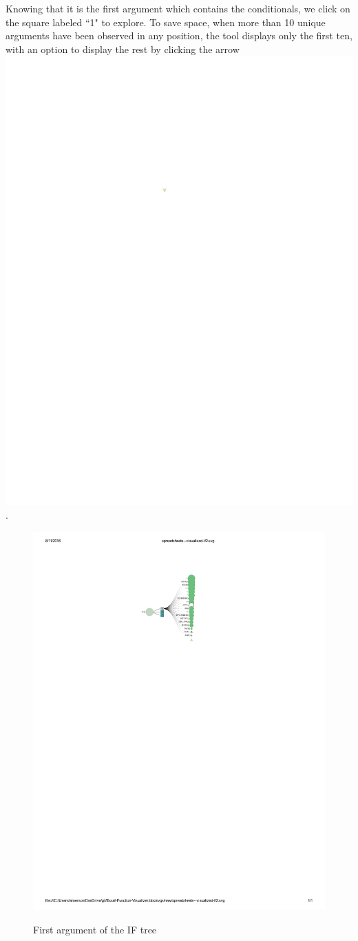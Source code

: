 \documentclass[conference]{IEEEtran}
\begin{document}
	Knowing that it is the first argument which contains the conditionals, we click
	on the square labeled ``1" to explore. To save space, when more than 10 unique
	arguments have been observed in any position, the tool displays only the first
	ten, with an option to display the rest by clicking the arrow
	\includegraphics{glossary-arrow}.
	
	\begin{figure}[h] \centering \includegraphics[width=.43\textwidth]{IFexpand}
		\label{fig:expandif} \caption{First argument of the IF tree} \end{figure}
	
\end{document}
